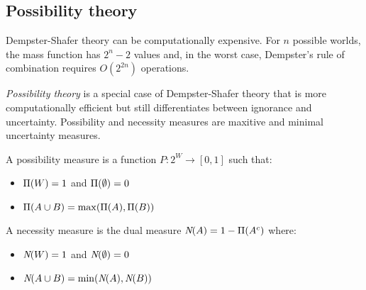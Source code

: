 \subsection{Possibility theory}

Dempster-Shafer theory can be computationally expensive.
For $n$ possible worlds, the mass function has $2^n - 2$ values and, in the
worst case, Dempster's rule of combination requires $O(2^{2n})$ operations.

\emph{Possibility theory} is a special case of Dempster-Shafer theory that is
more computationally efficient but still differentiates between ignorance and
uncertainty.
Possibility and necessity measures are maxitive and minimal uncertainty
measures.

\begin{dfn}
  \label{def:4:PossibilityNecessity}
  A possibility measure is a function $P : 2^W \to [0, 1]$ such that:
  \begin{itemize}
    \item $\operatorname*{\Pi}(W) = 1$ and $\operatorname*{\Pi}(\emptyset) = 0$
    \item $\operatorname*{\Pi}(A \cup B) = \max(\operatorname*{\Pi}(A), \operatorname*{\Pi}(B))$
  \end{itemize}
  A necessity measure is the dual measure $\textit{N}(A) = 1 - \operatorname*{\Pi}(A^c)$ where:
  \begin{itemize}
    \item $\textit{N}(W) = 1$ and $\textit{N}(\emptyset) = 0$
    \item $\textit{N}(A \cup B) = \min(\textit{N}(A), \textit{N}(B))$
  \end{itemize}
\end{dfn}

